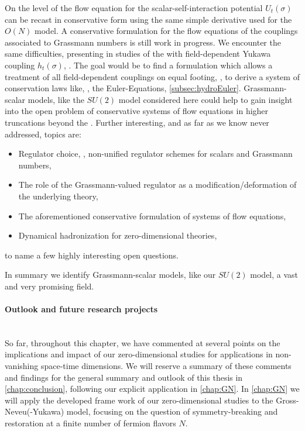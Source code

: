 On the level of the flow equation for the scalar-self-interaction potential $U_t(\sigma)$ can be recast in conservative form using the same simple derivative used for the $O(N)$ model.
A conservative formulation for the flow equations of the couplings associated to Grassmann numbers is still work in progress.
We encounter the same difficulties, presenting in studies of the \qmm{} with field-dependent Yukawa coupling $h_t(\sigma)$, \cf{} \ccite{\consYRef}.
The goal would be to find a formulation which allows a treatment of all field-dependent couplings on equal footing, \ie{}, to derive a system of conservation laws like, \eg{}, the Euler-Equations, \cf{} \cref{subsec:hydroEuler}.
Grassmann-scalar models, like the $SU(2)$ model considered here could help to gain insight into the open problem of conservative systems of flow equations in higher truncations beyond the \lpa{}.
Further interesting, and as far as we know never addressed, topics are:
\begin{itemize}
	\item Regulator choice, \ie{}, non-unified regulator schemes for scalars and Grassmann numbers,
	\item The role of the Grassmann-valued regulator as a modification/deformation of the underlying theory,
	\item The aforementioned conservative formulation of systems of flow equations,
	\item Dynamical hadronization for zero-dimensional theories,
\end{itemize}
to name a few highly interesting open questions.

In summary we identify Grassmann-scalar models, like our $SU(2)$ model, a vast and very promising field.

\paragraph{Outlook and future research projects}\label{paragraph:0dconclusionOutlook}\mbox{}\\%
So far, throughout this chapter, we have commented at several points on the implications and impact of our zero-dimensional studies for applications in non-vanishing space-time dimensions.
We will reserve a summary of these comments and findings for the general summary and outlook of this thesis in \cref{chap:conclusion}, following our explicit application in \cref{chap:GN}.
In \cref{chap:GN} we will apply the developed frame work of our zero-dimensional studies to the \twoDimensional{} Gross-Neveu(-Yukawa) model, focusing on the question of symmetry-breaking and restoration at a finite number of fermion flavors $N$.


